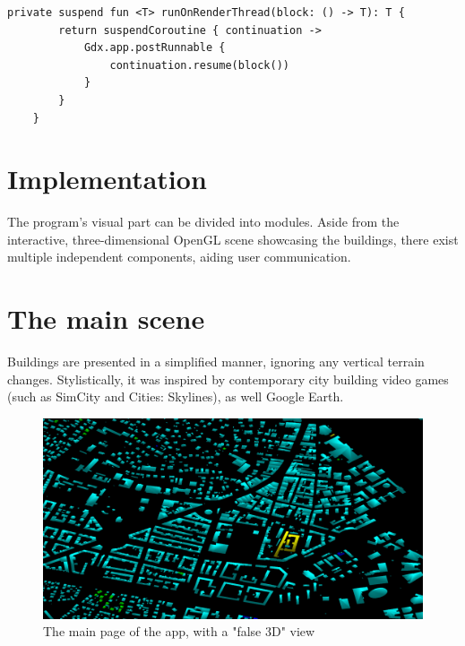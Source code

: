 
\begin{lstlisting}[caption=Helper function for getting the draw thread]
private suspend fun <T> runOnRenderThread(block: () -> T): T {
        return suspendCoroutine { continuation ->
            Gdx.app.postRunnable {
                continuation.resume(block())
            }
        }
    }
\end{lstlisting}

\section{Implementation}
The program's visual part can be divided into modules. Aside from the interactive, three-dimensional OpenGL scene showcasing the buildings, there exist multiple independent components, aiding user communication.


\section{The main scene}
Buildings are presented in a simplified manner, ignoring any vertical terrain changes. Stylistically, it was inspired by contemporary city building video games (such as SimCity and Cities: Skylines), as well Google Earth.

\begin{figure}[!ht]
    \centering
    \includegraphics[width=150mm, keepaspectratio]{images/main_graphics_view.png}
    \caption{The main page of the app, with a "false 3D" view}
\end{figure}

